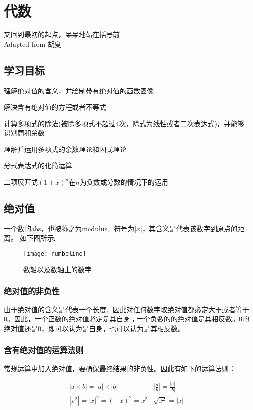 \chapter{代数}
又回到最初的起点，呆呆地站在括号前\\
\makebox{}\hfill Adapted from 胡夏

\section*{学习目标}
\begin{todolist}
 \item 理解绝对值的含义，并绘制带有绝对值的函数图像
 \item 解决含有绝对值的方程或者不等式
 \item 计算多项式的除法(被除多项式不超过4次，除式为线性或者二次表达式)，并能够识别商和余数
 \item 理解并运用多项式的余数理论和因式理论
 \item 分式表达式的化简运算
 \item 二项展开式$(1+x)^n$在$n$为负数或分数的情况下的运用
\end{todolist}
\clearpage

\section{绝对值}
一个数的\gls{abs}，也被称之为modulus。符号为$|x|$，其含义是代表该数字到原点的距离。
如下图所示:
\begin{figure}[H]
\centering
\texttt{[image: numbeline]}
\caption{数轴以及数轴上的数字}
\end{figure}

\subsection*{绝对值的非负性}
由于绝对值的含义是代表一个长度，因此对任何数字取绝对值都必定大于或者等于$0$。因此，一个正数的绝对值必定是其自身；一个负数的的绝对值是其相反数。$0$的绝对值还是$0$，即可以认为是自身，也可以认为是其相反数。

\subsection*{含有绝对值的运算法则}
常规运算中加入绝对值，要确保最终结果的非负性。因此有如下的运算法则：

\[
\begin{matrix}
|a\times b| = |a| \times |b|  & \left|\frac{a}{b}\right| = \frac{|a|}{|b|}\\
|x^2| =|x|^2 =(-x)^2=x^2 & \sqrt{x^2} =|x|
\end{matrix}
\]

